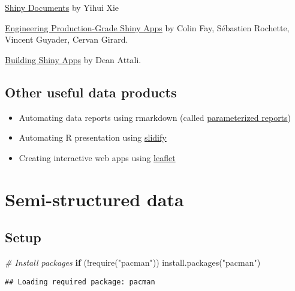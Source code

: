 \documentclass[
]{book}
\newenvironment{Shaded}{\begin{snugshade}}{\end{snugshade}}
\newcommand{\CommentTok}[1]{\textcolor[rgb]{0.56,0.35,0.01}{\textit{#1}}}
\newcommand{\ControlFlowTok}[1]{\textcolor[rgb]{0.13,0.29,0.53}{\textbf{#1}}}
\newcommand{\FunctionTok}[1]{\textcolor[rgb]{0.00,0.00,0.00}{#1}}
\newcommand{\NormalTok}[1]{#1}
\newcommand{\SpecialCharTok}[1]{\textcolor[rgb]{0.00,0.00,0.00}{#1}}
\newcommand{\StringTok}[1]{\textcolor[rgb]{0.31,0.60,0.02}{#1}}
\providecommand{\tightlist}{%
  \setlength{\itemsep}{0pt}\setlength{\parskip}{0pt}}
\begin{document}
\href{https://bookdown.org/yihui/rmarkdown/shiny-documents.html}{Shiny Documents} by Yihui Xie

\href{https://engineering-shiny.org/}{Engineering Production-Grade Shiny Apps} by Colin Fay, Sébastien Rochette, Vincent Guyader, Cervan Girard.

\href{https://stat545.com/shiny-tutorial.html}{Building Shiny Apps} by Dean Attali.

\hypertarget{other-useful-data-products}{%
\section{Other useful data products}\label{other-useful-data-products}}

\begin{itemize}
\tightlist
\item
  Automating data reports using rmarkdown (called \href{https://rmarkdown.rstudio.com/developer_parameterized_reports.html\%23parameter_types\%2F}{parameterized reports})
\item
  Automating R presentation using \href{http://slidify.org/index.html}{slidify}
\item
  Creating interactive web apps using \href{https://rstudio.github.io/leaflet/}{leaflet}
\end{itemize}

\hypertarget{semi_structured_data}{%
\chapter{Semi-structured data}\label{semi_structured_data}}

\hypertarget{setup-4}{%
\section{Setup}\label{setup-4}}

\begin{Shaded}
\begin{Highlighting}[]
\CommentTok{\# Install packages }
\ControlFlowTok{if}\NormalTok{ (}\SpecialCharTok{!}\FunctionTok{require}\NormalTok{(}\StringTok{"pacman"}\NormalTok{)) }\FunctionTok{install.packages}\NormalTok{(}\StringTok{"pacman"}\NormalTok{)}
\end{Highlighting}
\end{Shaded}

\begin{verbatim}
## Loading required package: pacman
\end{verbatim}
\end{document}
